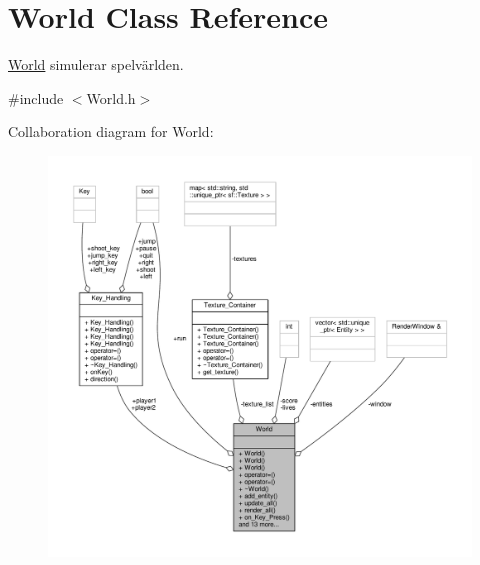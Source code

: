 \hypertarget{classWorld}{\section{World Class Reference}
\label{classWorld}
}


\hyperlink{classWorld}{World} simulerar spelvärlden.  




{\ttfamily \#include $<$World.\+h$>$}



Collaboration diagram for World\+:\nopagebreak
\begin{figure}[H]
\begin{center}
\leavevmode
\includegraphics[width=350pt]{classWorld__coll__graph}
\end{center}
\end{figure}
